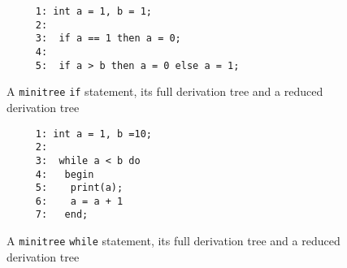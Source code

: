 \begin{figure}
\hspace*{2.5cm}
\begin{minipage}{10cm}
\begin{verbatim}
     1: int a = 1, b = 1;
     2: 
     3:  if a == 1 then a = 0;
     4: 
     5:  if a > b then a = 0 else a = 1;
\end{verbatim}
\end{minipage}

\vspace*{1cm}

\hspace*{0cm}
\begin{minipage}{10cm}
\end{minipage}

\vspace*{\fill}

\hspace*{2cm}
\begin{minipage}{10cm}
\end{minipage}

\caption{A {\tt minitree} {\tt if} statement, its full derivation tree and a reduced derivation tree}
\label{tree:if}
\end{figure}

\begin{figure}
\hspace*{3cm}
\begin{minipage}{10cm}
\begin{verbatim}
     1: int a = 1, b =10;
     2: 
     3:  while a < b do
     4:   begin
     5:    print(a);
     6:    a = a + 1
     7:   end;
\end{verbatim}
\end{minipage}

\vspace*{1cm}

\hspace*{1cm}
\begin{minipage}{10cm}
\end{minipage}

\vspace*{\fill}

\hspace*{3cm}
\begin{minipage}{10cm}
\end{minipage}

\caption{A {\tt minitree} {\tt while} statement, its full derivation tree and a reduced derivation tree}
\label{tree:wh}
\end{figure}

